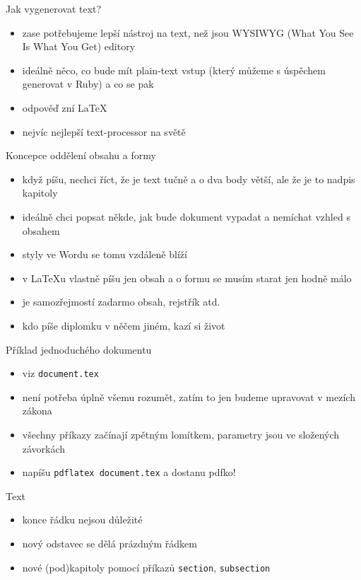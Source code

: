 \documentclass{beamer}
\begin{document}
\begin{frame}{Jak vygenerovat text?}
  \begin{itemize}
    \item zase potřebujeme lepší nástroj na text, než jsou WYSIWYG (What You See Is What You Get) editory
    \item ideálně něco, co bude mít plain-text vstup (který můžeme s úspěchem generovat v Ruby) a co se pak
    \item odpověď zní \LaTeX
    \item nejvíc nejlepší text-processor na světě
  \end{itemize}
\end{frame}

\begin{frame}{Koncepce oddělení obsahu a formy}
  \begin{itemize}
    \item když píšu, nechci říct, že je text tučně a o dva body větší, ale že je to nadpis kapitoly
    \item ideálně chci popsat někde, jak bude dokument vypadat a nemíchat vzhled s obsahem
    \item styly ve Wordu se tomu vzdáleně blíží
    \item v LaTeXu vlastně píšu jen obsah a o formu se musím starat jen hodně málo
    \item je samozřejmostí zadarmo obsah, rejstřík atd.
    \item kdo píše diplomku v něčem jiném, kazí si život
  \end{itemize}
\end{frame}

\begin{frame}{Příklad jednoduchého dokumentu}
  \begin{itemize}
    \item viz \texttt{document.tex}
    \item není potřeba úplně všemu rozumět, zatím to jen budeme upravovat v mezích zákona
    \item všechny příkazy začínají zpětným lomítkem, parametry jsou ve složených závorkách
    \item napíšu \texttt{pdflatex document.tex} a dostanu pdfko!
  \end{itemize}
\end{frame}

\begin{frame}{Text}
  \begin{itemize}
    \item konce řádku nejsou důležité
    \item nový odstavec se dělá prázdným řádkem
    \item nové (pod)kapitoly pomocí příkazů \texttt{section}, \texttt{subsection}
  \end{itemize}
\end{frame}
\end{document}
